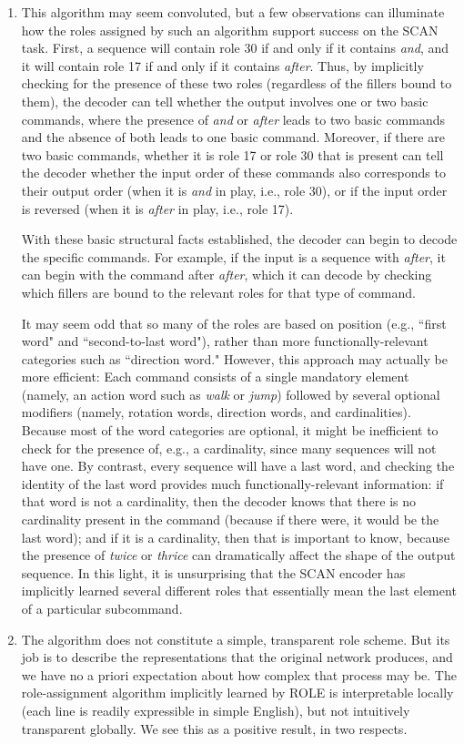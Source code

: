 \begin{enumerate}
    \item 
This algorithm may seem convoluted, but a few observations can illuminate how the roles assigned by such an algorithm support success on the SCAN task. First, a sequence will contain role 30 if and only if it contains \textit{and}, and it will contain role 17 if and only if it contains \textit{after}. Thus, by implicitly checking for the presence of these two roles (regardless of the fillers bound to them), the decoder can tell whether the output involves one or two basic commands, where the presence of \textit{and} or \textit{after} leads to two basic commands and the absence of both leads to one basic command. Moreover, if there are two basic commands, whether it is role 17 or role 30 that is present can tell the decoder whether the input order of these commands also corresponds to their output order (when it is \textit{and} in play, i.e., role 30), or if the input order is reversed (when it is \textit{after} in play, i.e., role 17).

With these basic structural facts established, the decoder can begin to decode the specific commands. For example, if the input is a sequence with \textit{after}, it can begin with the command after \textit{after}, which it can decode by checking which fillers are bound to the relevant roles for that type of command.

It may seem odd that so many of the roles are based on position (e.g., ``first word" and ``second-to-last word"), rather than more functionally-relevant categories such as ``direction word." However, this approach may actually be more efficient: Each command consists of a single mandatory element (namely, an action word such as \textit{walk} or \textit{jump}) followed by several optional modifiers (namely, rotation words, direction words, and cardinalities). Because most of the word categories are optional, it might be inefficient to check for the presence of, e.g., a cardinality, since many sequences will not have one. By contrast, every sequence will have a last word, and checking the identity of the last word provides much functionally-relevant information: if that word is not a cardinality, then the decoder knows that there is no cardinality present in the command (because if there were, it would be the last word); and if it is a cardinality, then that is important to know, because the presence of \textit{twice} or \textit{thrice} can dramatically affect the shape of the output sequence. In this light, it is unsurprising that the SCAN encoder has implicitly learned several different roles that essentially mean the last element of a particular subcommand.
\item
The algorithm does not constitute a simple, transparent role scheme. But its job is to describe the representations that the original network produces, and we have no a priori expectation about how complex that process may be. The role-assignment algorithm implicitly learned by ROLE is interpretable locally (each line is readily expressible in simple English), but not intuitively transparent globally. We see this as a positive result, in two respects.


\end{enumerate}
